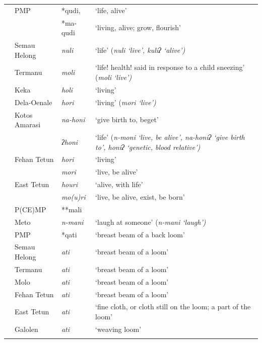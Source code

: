 {\wg\begin{xltabular}{\linewidth}{>{\hspace{-\tabcolsep}}l<{\hspace{-\tabcolsep}}>{\hspace{-\tabcolsep}\enspace}llX}
\lsptoprule
{}	&	PMP	&	*qudi,	&	‘life, alive’\\ \hhline{~}
	&		&	*ma-qudi	&	‘living, alive; grow, flourish’\\  \midrule\hhline{~}
	&	Semau Helong	&	\it{nuli}	&	‘life’ (\it{nuli} ‘live’, \it{kuliʔ} ‘alive’)\\
	&	Termanu	&	\it{moli}	&	‘life! health! said in response to a child sneezing’ (\it{moli} ‘live’)\\
	&	Keka	&	\it{holi} 	&	‘living’\\
	&	Dela-Oenale	&	\it{hori}	&	‘living’ (\it{mori} ‘live’)\\
	&	Kotos Amarasi	&	\it{na-honi}	&	‘give birth to, beget’\\
	&		&	\it{ʔhoni}	&	‘life’ (\it{n-moni} ‘live, be alive’, \it{na-honiʔ} ‘give birth to’, \it{honiʔ} ‘genetic, blood relative’)\\
	&	Fehan Tetun	&	\it{hori}	&	‘living’\\
	&		&	\it{mori}	&	‘live, be alive’\\
	&	East Tetun	&	\it{houri}	&	‘alive, with life’\\
	&		&	\it{mo(u)ri}	&	‘live, be alive, exist, be born’\\  \midrule\hhline{~}
	&	P(CE)MP	&	**mali	&	\hp{ }\\
	&	Meto	&	\it{n-mani}	&	‘laugh at someone’ (\it{n-mani} ‘laugh’)\\  \midrule\hhline{~}
	&	PMP 	&	*qati	&	‘breast beam of a back loom’\\
	&	Semau Helong	&	\it{ati}	&	‘breast beam of a loom’\\
	&	Termanu	&	\it{ati}	&	‘breast beam of a loom’\\
	&	Molo	&	\it{ati}	&	‘breast beam of a loom’\\
	&	Fehan Tetun	&	\it{ati}	&	‘breast beam of a loom’\\
	&	East Tetun	&	\it{ati}	&	‘fine cloth, or cloth still on the loom; a part of the loom’\\
	&	Galolen	&	\it{ati}	&	‘weaving loom’\\
\lspbottomrule
\end{xltabular}\addtocounter{table}{-1}}

